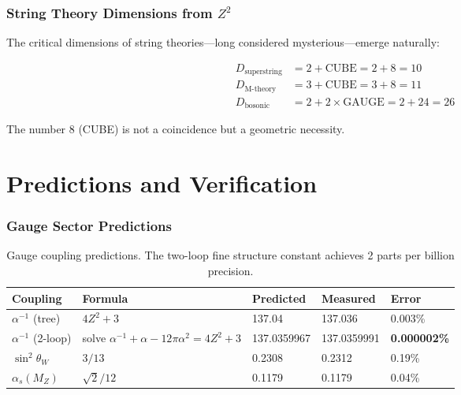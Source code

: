 \documentclass[11pt,a4paper]{article}
\theoremstyle{plain}
\theoremstyle{definition}
\theoremstyle{remark}
\newcommand{\MZ}{M_Z}
\newcommand{\alphas}{\alpha_s}
\newcommand{\thetaW}{\theta_W}
\newcommand{\CUBE}{\text{CUBE}}
\newcommand{\GAUGE}{\text{GAUGE}}
\begin{document}
\section{String Theory Dimensions from $Z^2$}

The critical dimensions of string theories---long considered mysterious---emerge naturally:

\begin{align}
D_{\text{superstring}} &= 2 + \CUBE = 2 + 8 = 10 \\
D_{\text{M-theory}} &= 3 + \CUBE = 3 + 8 = 11 \\
D_{\text{bosonic}} &= 2 + 2 \times \GAUGE = 2 + 24 = 26
\end{align}

The number 8 (CUBE) is not a coincidence but a geometric necessity.

\part{Predictions and Verification}

\section{Gauge Sector Predictions}

\begin{table}[h!]
\centering
\begin{tabular}{lllll}
\toprule
\textbf{Coupling} & \textbf{Formula} & \textbf{Predicted} & \textbf{Measured} & \textbf{Error} \\
\midrule
$\alpha^{-1}$ (tree) & $4Z^2 + 3$ & 137.04 & 137.036 & 0.003\% \\
$\alpha^{-1}$ (2-loop) & solve $\alpha^{-1} + \alpha - 12\pi\alpha^2 = 4Z^2 + 3$ & 137.0359967 & 137.0359991 & \textbf{0.000002\%} \\
$\sin^2\thetaW$ & $3/13$ & 0.2308 & 0.2312 & 0.19\% \\
$\alphas(\MZ)$ & $\sqrt{2}/12$ & 0.1179 & 0.1179 & 0.04\% \\
\bottomrule
\end{tabular}
\caption{Gauge coupling predictions. The two-loop fine structure constant achieves 2 parts per billion precision.}
\end{table}
\end{document}
